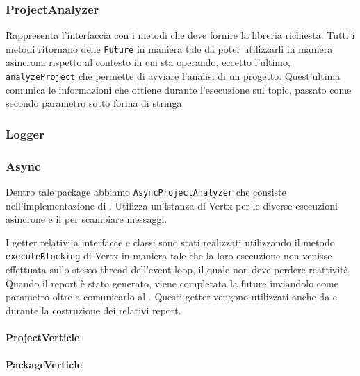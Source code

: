 \subsubsection{ProjectAnalyzer}
\label{subsubs:project_analyzer}

Rappresenta l'interfaccia con i metodi che deve fornire la libreria richiesta. Tutti i metodi ritornano delle \texttt{Future} in maniera tale da poter utilizzarli in maniera asincrona rispetto al contesto in cui sta operando, eccetto l'ultimo, \texttt{analyzeProject} che permette di avviare l'analisi di un progetto. Quest'ultima comunica le informazioni che ottiene durante l'esecuzione sul topic,  passato come secondo parametro sotto forma di stringa.

\subsubsection{Logger}
\label{subsubs:logger}

\subsubsection{Async}
\label{subsubs:async}

Dentro tale package abbiamo \texttt{AsyncProjectAnalyzer} che consiste nell'implementazione di \texttt{}. Utilizza un'istanza di Vertx per le diverse esecuzioni asincrone e il  per scambiare messaggi.

I getter relativi a interfacce e classi sono stati realizzati utilizzando il metodo \texttt{executeBlocking} di Vertx in maniera tale che la loro esecuzione non venisse effettuata sullo stesso thread dell'event-loop, il quale non deve perdere reattività. Quando il report è stato generato, viene completata la future inviandolo come parametro oltre a comunicarlo al . Questi getter vengono utilizzati anche da  e  durante la costruzione dei relativi report.

\paragraph{ProjectVerticle}
\label{para:project_verticle}

\paragraph{PackageVerticle}
\label{para:package_verticle}

